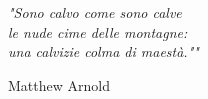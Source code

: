 \newlength\longest

\clearpage

\thispagestyle{empty}
\null\vfill

\settowidth{}
\begin{center}
    \parbox{\longest}{%
        \raggedright{\LARGE\itshape%
            "Sono calvo come sono calve\\
            le nude cime delle montagne:\\
            una calvizie colma di maestà.""\par\bigskip
        }
        \raggedleft\Large{Matthew Arnold}\par%
    }
\end{center}


\vfill\vfill

\clearpage